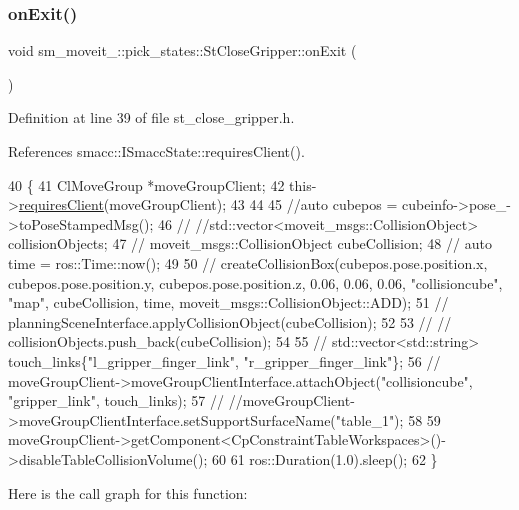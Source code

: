 \subsubsection{\texorpdfstring{on\+Exit()}{onExit()}}
{\footnotesize\ttfamily void sm\+\_\+moveit\+\_\+::pick\+\_\+states\+::\+St\+Close\+Gripper\+::on\+Exit (\begin{DoxyParamCaption}{ }\end{DoxyParamCaption})\hspace{0.3cm}{\ttfamily [inline]}}



Definition at line 39 of file st\+\_\+close\+\_\+gripper.\+h.



References smacc\+::\+I\+Smacc\+State\+::requires\+Client().


\begin{DoxyCode}
40          \{
41             ClMoveGroup *moveGroupClient;
42             this->\hyperlink{classsmacc_1_1ISmaccState_a7f95c9f0a6ea2d6f18d1aec0519de4ac}{requiresClient}(moveGroupClient);
43 
44 
45             \textcolor{comment}{//auto cubepos = cubeinfo->pose\_->toPoseStampedMsg();}
46             \textcolor{comment}{// //std::vector<moveit\_msgs::CollisionObject> collisionObjects;}
47             \textcolor{comment}{// moveit\_msgs::CollisionObject cubeCollision;}
48             \textcolor{comment}{// auto time = ros::Time::now();}
49 
50             \textcolor{comment}{// createCollisionBox(cubepos.pose.position.x, cubepos.pose.position.y,
       cubepos.pose.position.z, 0.06, 0.06, 0.06, "collisioncube", "map",  cubeCollision, time, moveit\_msgs::CollisionObject::ADD);}
51             \textcolor{comment}{// planningSceneInterface.applyCollisionObject(cubeCollision);}
52 
53             \textcolor{comment}{// // collisionObjects.push\_back(cubeCollision);}
54             
55             \textcolor{comment}{// std::vector<std::string> touch\_links\{"l\_gripper\_finger\_link", "r\_gripper\_finger\_link"\};}
56             \textcolor{comment}{// moveGroupClient->moveGroupClientInterface.attachObject("collisioncube", "gripper\_link",
       touch\_links);}
57             \textcolor{comment}{// //moveGroupClient->moveGroupClientInterface.setSupportSurfaceName("table\_1");}
58             
59             moveGroupClient->getComponent<CpConstraintTableWorkspaces>()->disableTableCollisionVolume();
60 
61             ros::Duration(1.0).sleep();
62          \}
\end{DoxyCode}
Here is the call graph for this function\+:
\nopagebreak
